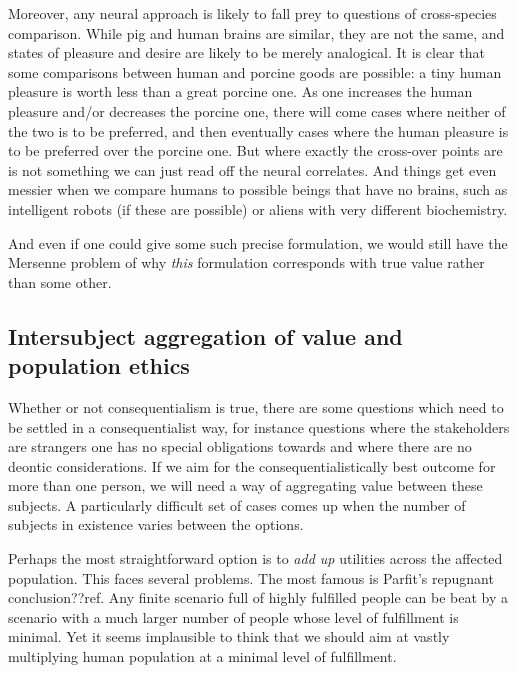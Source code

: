 Moreover, any neural approach is likely to fall prey to questions of cross-species comparison. While pig and human brains are
similar, they are not the same, and states of pleasure and desire are likely to be merely analogical. It is clear that some
comparisons between human and porcine goods are possible: a tiny human pleasure is worth less than a great porcine one. As one
increases the human pleasure and/or decreases the porcine one, there will come cases where neither of the two is to be
preferred, and then eventually cases where the human pleasure is to be preferred over the porcine one. But where exactly
the cross-over points are is not something we can just read off the neural correlates. And things get even messier when we
compare humans to possible beings that have no brains, such as intelligent robots (if these are possible) or aliens with very 
different biochemistry.

And even if one could give some such precise formulation, we would still have
the Mersenne problem of why \textit{this} formulation corresponds with true value rather than some other. 

\subsection{Intersubject aggregation of value and population ethics}
Whether or not consequentialism is true, there are some questions which need to be settled in a 
consequentialist way, for instance questions where the stakeholders are strangers one has no special obligations 
towards and where there are no deontic considerations. If we aim for the consequentialistically best outcome for 
more than one person, we will need a way of aggregating value between these subjects. A particularly difficult set
of cases comes up when the number of subjects in existence varies between the options.

Perhaps the most straightforward option is to \textit{add up} utilities across the affected population. This faces
several problems. The most famous is Parfit's repugnant conclusion??ref. Any finite scenario full of highly
fulfilled people can be beat by a scenario with a much larger number of people whose level of fulfillment is
minimal. Yet it seems implausible to think that we should aim at vastly multiplying human population at a 
minimal level of fulfillment. 

